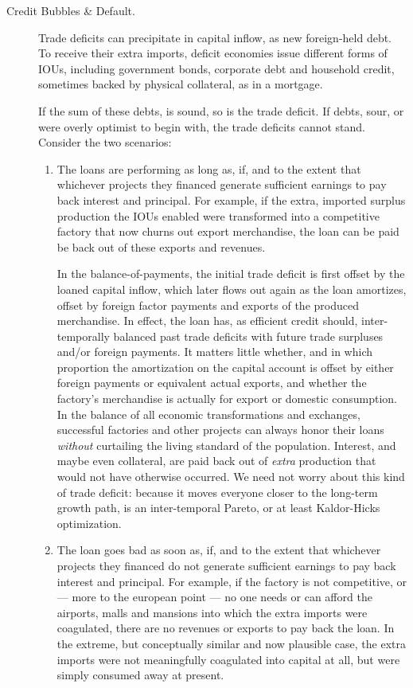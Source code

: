 \documentclass[11pt,a4paper,oneside,openright]{article}
\begin{document}
\begin{description}
	\item[Credit Bubbles \& Default.]  Trade deficits can precipitate in capital inflow, as new foreign-held debt. 
	To receive their extra imports, deficit economies issue different forms of IOUs, including government bonds, corporate debt and household credit, sometimes backed by physical collateral, as in a mortgage.%

	If the sum of these debts, is sound, so is the trade deficit. 
	If debts, sour, or were overly optimist to begin with, the trade deficits cannot stand. 
	Consider the two scenarios:
	\begin{enumerate}
		\item The loans are performing as long as, if, and to the extent that whichever projects they financed generate sufficient earnings to pay back interest and principal. 
		For example, if the extra, imported surplus production the IOUs enabled were transformed into a competitive factory that now churns out export merchandise, the loan can be paid be back out of these exports and revenues. 
		
		In the \gls{balance-of-payments}, the initial trade deficit is first offset by the loaned capital inflow, which later flows out again as the loan amortizes, offset by foreign factor payments and exports of the produced merchandise. 
		In effect, the loan has, as efficient credit should, inter-temporally balanced past trade deficits with future trade surpluses and/or foreign payments. 
		It matters little whether, and in which proportion the amortization on the capital account is offset by either foreign payments or equivalent actual exports, and whether the factory's merchandise is actually for export or domestic consumption. 
		In the balance of all economic transformations and exchanges, successful factories and other projects can always honor their loans \emph{without} curtailing the living standard of the population. 
		Interest, and maybe even collateral, are paid back out of \emph{extra} production that would not have otherwise occurred. 
		We need not worry about this kind of trade deficit: 
		because it moves everyone closer to the long-term growth path, is an inter-temporal Pareto, or at least Kaldor-Hicks optimization.

		\item The loan goes bad as soon as, if, and to the extent that whichever projects they financed do not generate sufficient earnings to pay back interest and principal. 
		For example, if the factory is not competitive, or --- more to the european point --- no one needs or can afford the airports, malls and mansions into which the extra imports were coagulated, there are no revenues or exports to pay back the loan. 
		In the extreme, but conceptually similar and now plausible case, the extra imports were not meaningfully coagulated into capital at all, but were simply consumed away at present.
		

\end{enumerate}
\end{description}
\end{document}
